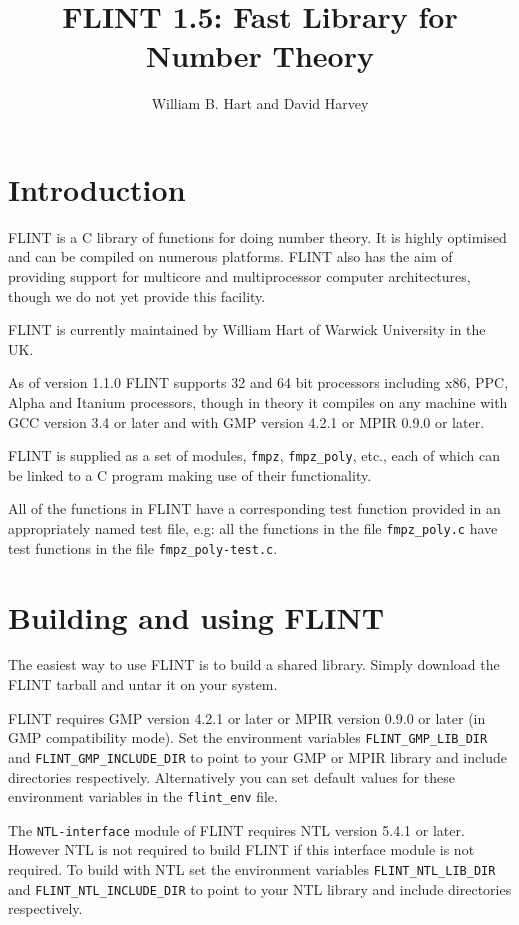 \documentclass[a4paper,10pt]{article}
\title{FLINT 1.5: Fast Library for Number Theory}
\author{William B. Hart and David Harvey}
\newcommand{\code}{\lstinline}
\begin{document}
\maketitle
\tableofcontents
\lstset{language=c}
\lstset{basicstyle=\ttfamily}
\lstset{keywordstyle=}
\lstset{escapeinside=\%\%}

\section{Introduction}

FLINT is a C library of functions for doing number theory. It is highly optimised and can be compiled on numerous platforms. FLINT also has the aim of providing support for multicore and multiprocessor computer architectures, though we do not yet provide this facility.

FLINT is currently maintained by William Hart of Warwick University in the UK.

As of version 1.1.0 FLINT supports 32 and 64 bit processors including x86, PPC, Alpha and Itanium processors, though in theory it compiles on any machine with GCC version 3.4 or later and with GMP version 4.2.1 or MPIR 0.9.0 or later.

FLINT is supplied as a set of modules, \code{fmpz}, \code{fmpz_poly}, etc., each of which can be linked to a C program making use of their functionality. 

All of the functions in FLINT have a corresponding test function provided in an appropriately named test file, e.g: all the functions in the file \code{fmpz_poly.c} have test functions in the file \code{fmpz_poly-test.c}.

\section{Building and using FLINT}

The easiest way to use FLINT is to build a shared library. Simply download the FLINT tarball and untar it on your system.

FLINT requires GMP version 4.2.1 or later or MPIR version 0.9.0 or later (in GMP compatibility mode). Set the environment variables \code{FLINT_GMP_LIB_DIR} and \code{FLINT_GMP_INCLUDE_DIR} to point to your GMP or MPIR library and include directories respectively. Alternatively you can set default values for these environment variables in the \code{flint_env} file.

The \code{NTL-interface} module of FLINT requires NTL version 5.4.1 or later. However NTL is not required to build FLINT if this interface module is not required. To build with NTL set the environment variables \code{FLINT_NTL_LIB_DIR} and \code{FLINT_NTL_INCLUDE_DIR} to point to your NTL library and include directories respectively.
\end{document}
